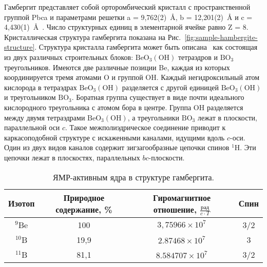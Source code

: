 Гамбергит представляет собой орторомбический кристалл с пространственной группой Pbca
и параметрами решетки a = 9,762(2)~\r{A}, b = 12,201(2)~\r{A} и c = 4,430(1)~\r{A}~\cite{Gatta2012}.
Число структурных единиц в элементарной ячейке равно Z = 8.
Кристаллическая структура гамбергита показана на Рис.~\ref{fig:sample-hambergite-structure}.
Структура кристалла гамбергита может быть описана~\cite{Zachariasen1931, Zachariasen1963, Gatta2012, Burns1995} как состоящая из двух различных строительных блоков:
$\mathrm{BeO}_3(\mathrm{OH})$ тетраэдров
и $\mathrm{BO}_3$ треугольников.
Имеются две различные позиции Be,
каждая из которых координируется тремя атомами O и группой OH.
Каждый негидроксильный атом кислорода в тетраэдрах $\mathrm{BeO}_3(\mathrm{OH})$
разделяется с другой единицей $\mathrm{BeO}_3(\mathrm{OH})$
и треугольником $\mathrm{BO}_3$.
Боратная группа существует в виде почти идеального кислородного треугольника с атомом бора в центре.
Группа OH разделяется между двумя тетраэдрами $\mathrm{BeO}_3(\mathrm{OH})$,
а треугольники $\mathrm{BO}_3$ лежат в плоскости, параллельной оси $c$.
Такое межполиэдрическое соединение приводит к каркасоподобной структуре с искаженными каналами,
идущими вдоль $c$-оси.
Один из двух видов каналов содержит зигзагообразные цепочки спинов $^1$H.
Эти цепочки лежат в плоскостях, параллельных $bc$-плоскости.

\begin{table}[h]
  \centering
  \begin{tabular}{|c|c|c|c|}
    \hline
    Изотоп & Природное содержание, \% & Гиромагнитное отношение, $\frac{\mbox{рад}}{c \cdot T}$ & Спин \\ %
    \hline\hline
    $^9$Be & 100 & $3,75966 \times 10^7$ & 3/2 \\
    \hline
    $^{10}$B & 19,9 & $2.87468 \times 10^7$ & 3 \\
    \hline
    $^{11}$B & 81,1 & $8.584707 \times 10^7$ & 3/2 \\
    \hline
  \end{tabular}
  \caption{
    ЯМР-активным ядра в структуре гамбергита.
   }
  \label{tab:hambergite-isotopes}
\end{table}

